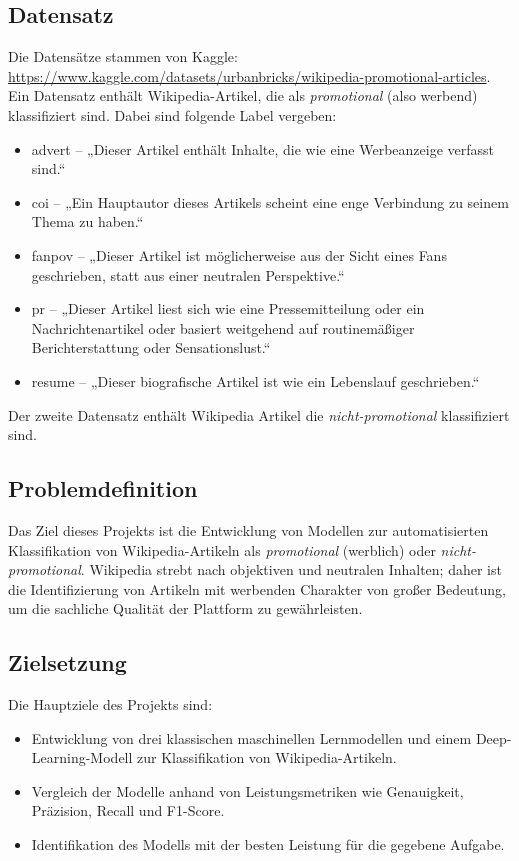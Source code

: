 \documentclass[researchlab,palatino]{AIGpaper}
\begin{document}
\subsection{Datensatz}
Die Datensätze stammen von Kaggle: \url{https://www.kaggle.com/datasets/urbanbricks/wikipedia-promotional-articles}. Ein Datensatz enthält Wikipedia-Artikel, die als \emph{promotional} (also werbend) klassifiziert sind. Dabei sind folgende Label vergeben:
\begin{itemize}
    \item advert – „Dieser Artikel enthält Inhalte, die wie eine Werbeanzeige verfasst sind.“
\item coi – „Ein Hauptautor dieses Artikels scheint eine enge Verbindung zu seinem Thema zu haben.“
\item fanpov – „Dieser Artikel ist möglicherweise aus der Sicht eines Fans geschrieben, statt aus einer neutralen Perspektive.“
\item pr – „Dieser Artikel liest sich wie eine Pressemitteilung oder ein Nachrichtenartikel oder basiert weitgehend auf routinemäßiger Berichterstattung oder Sensationslust.“
\item resume – „Dieser biografische Artikel ist wie ein Lebenslauf geschrieben.“
\end{itemize}
Der zweite Datensatz enthält Wikipedia Artikel die \emph{nicht-promotional} klassifiziert sind.

\subsection{Problemdefinition}

Das Ziel dieses Projekts ist die Entwicklung von Modellen zur automatisierten Klassifikation von Wikipedia-Artikeln als \emph{promotional} (werblich) oder \emph{nicht-promotional}. Wikipedia strebt nach objektiven und neutralen Inhalten; daher ist die Identifizierung von Artikeln mit werbenden Charakter von großer Bedeutung, um die sachliche Qualität der Plattform zu gewährleisten.

\subsection{Zielsetzung}

Die Hauptziele des Projekts sind:

\begin{itemize} \item Entwicklung von drei klassischen maschinellen Lernmodellen und einem Deep-Learning-Modell zur Klassifikation von Wikipedia-Artikeln. \item Vergleich der Modelle anhand von Leistungsmetriken wie Genauigkeit, Präzision, Recall und F1-Score. \item Identifikation des Modells mit der besten Leistung für die gegebene Aufgabe. \end{itemize}
\end{document}
